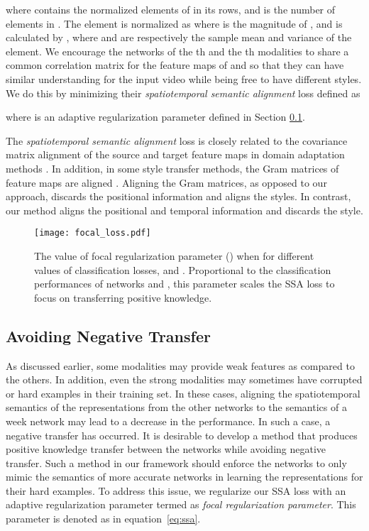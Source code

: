 \documentclass[10pt,twocolumn,letterpaper]{article}
\begin{document}
where  contains the normalized elements of  in its rows, and  is the number of elements in . The element  is normalized as   where  is the magnitude of , and  is calculated by , where  and  are respectively the sample mean and variance of the element.  We encourage the networks of the th and the th modalities to share a common correlation matrix for the feature maps of  and  so that they can have similar understanding for the input video while being free to have different styles.   We do this by minimizing their \emph{spatiotemporal semantic alignment} loss defined as

 where  is an adaptive regularization parameter defined in Section \ref{sec:focal}.
 
 The \emph{spatiotemporal semantic alignment} loss is closely related to the covariance matrix alignment of the source and target feature maps in domain adaptation methods \cite{sun2016deep,sun2017correlation}.  In addition, in some style transfer methods, the Gram matrices of feature maps are aligned \cite{gatys2015texture,gatys2016image}. Aligning the Gram matrices, as opposed to our approach, discards the positional information and aligns the styles.  In contrast, our method aligns the positional and temporal information and discards the style.
 
 \begin{figure}
\begin{center}
\texttt{[image: focal\_loss.pdf]}
\end{center}
   \caption{The value of focal regularization parameter () when   for different values of classification losses,  and .  Proportional to the classification performances of networks  and , this parameter scales the SSA loss to focus on transferring positive knowledge.}
\label{fig:focal}
\end{figure}

\subsection{Avoiding Negative Transfer}\label{sec:focal}
As discussed earlier, some modalities may provide weak features as compared to the others.  In addition, even the strong modalities may sometimes have corrupted or hard examples in their training set.    In these cases, aligning the spatiotemporal semantics of the representations from the other networks to the semantics of a week network may lead to a decrease in the performance. In such a case, a negative transfer has occurred. It is desirable to develop a method that produces positive knowledge transfer between the networks while avoiding negative transfer.   Such a method in our framework should enforce the networks to only mimic the semantics of more accurate networks in learning the representations for their hard examples.   To address this issue, we regularize our SSA loss with an adaptive regularization parameter termed as \emph{focal regularization parameter}.   This parameter is denoted as   in  equation~\eqref{eq:ssa}.
\end{document}
